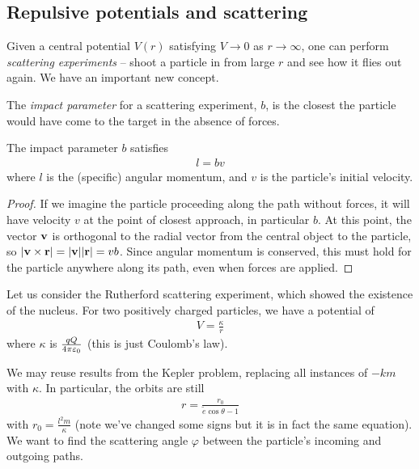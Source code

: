 \documentclass{../../template/note}
\begin{document}
    \subsection{Repulsive potentials and scattering}

    Given a central potential \(V(r)\) satisfying \(V \to 0\) as \(r \to \infty\), one can perform \emph{scattering experiments} -- shoot a particle in from large \(r\) and see how it flies out again. We have an important new concept.

    \begin{definition}
        The \emph{impact parameter} for a scattering experiment, \(b\), is the closest the particle would have come to the target in the absence of forces.
    \end{definition}

    \begin{proposition}
        The impact parameter \(b\) satisfies
        \begin{align*}
            l = bv
        \end{align*}
        where \(l\) is the (specific) angular momentum, and \(v\) is the particle's initial velocity.        
    \end{proposition}
    
    \begin{proof}
        If we imagine the particle proceeding along the path without forces, it will have velocity \(v\) at the point of closest approach, in particular \(b\). At this point, the vector \(\V v\) is orthogonal to the radial vector from the central object to the particle, so \(|\V v \times \V r| = |\V v||\V r| = vb\). Since angular momentum is conserved, this must hold for the particle anywhere along its path, even when forces are applied.
    \end{proof}
    
    Let us consider the Rutherford scattering experiment, which showed the existence of the nucleus. For two positively charged particles, we have a potential of
    \begin{align*}
        V = \frac{\kappa}{r}
    \end{align*}
    where \(\kappa\) is \(\frac{qQ}{4\pi\varepsilon_0}\) (this is just Coulomb's law).

    We may reuse results from the Kepler problem, replacing all instances of \(-km\) with \(\kappa\). In particular, the orbits are still
    \begin{align*}
        r = \frac{r_0}{\tilde e \cos \theta - 1}
    \end{align*}
    with \(r_0 = \frac{l^2m}{\kappa}\) (note we've changed some signs but it is in fact the same equation). We want to find the scattering angle \(\varphi\) between the particle's incoming and outgoing paths.
\end{document}
